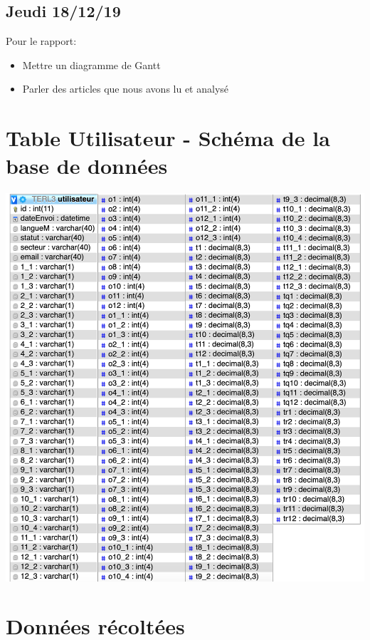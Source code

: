 \documentclass[11pt,letterpaper]{article}
\begin{document}
\subsection{Jeudi 18/12/19}
Pour le rapport:
\begin{itemize}
    \item Mettre un diagramme de Gantt
    \item Parler des articles que nous avons lu et analysé
\end{itemize}{} \vspace{5mm}

\newpage

\section{Table Utilisateur - Schéma de la base de données}

\vspace{15px}

\begin{center}
    \includegraphics[width=\textwidth]{figures/bdd.png}
\end{center}

\newpage

\section{Données récoltées}
\end{document}
